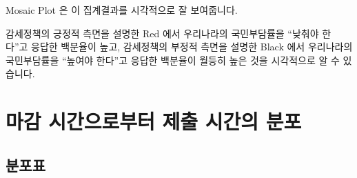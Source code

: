 \documentclass[
]{book}
\begin{document}
Mosaic Plot 은 이 집계결과를 시각적으로 잘 보여줍니다.

감세정책의 긍정적 측면을 설명한 Red 에서 우리나라의 국민부담률을 ``낮춰야 한다''고 응답한 백분율이 높고, 감세정책의 부정적 측면을 설명한 Black 에서 우리나라의 국민부담률을 ``높여야 한다''고 응답한 백분율이 월등히 높은 것을 시각적으로 알 수 있습니다.

\section{마감 시간으로부터 제출 시간의 분포}\label{uxb9c8uxac10-uxc2dcuxac04uxc73cuxb85cuxbd80uxd130-uxc81cuxcd9c-uxc2dcuxac04uxc758-uxbd84uxd3ec-2}

\subsection{분포표}\label{uxbd84uxd3ecuxd45c-2}
\end{document}
